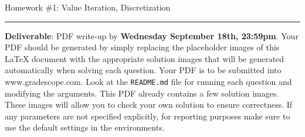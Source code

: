 \documentclass{article}
\newcommand{\ruleskip}{\bigskip\hrule\bigskip}
\begin{document}
\pagestyle{myheadings} 

{\huge
\noindent Homework \#1: Value Iteration, Discretization}
\ruleskip

{\bf Deliverable}:  PDF write-up by {\bf Wednesday September 18th, 23:59pm}.  Your PDF should be generated by simply replacing the placeholder images of this LaTeX document with the appropriate solution images that will be generated automatically when solving each question.  Your PDF is to be submitted into www.gradescope.com.  Look at the \texttt{README.md} file for running each question and modifying the arguments. This PDF already contains a few solution images.  These images will allow you to check your own solution to ensure correctness.  If any parameters are not specified explicitly, for reporting purposes make sure to use the default settings in the environments.   


\vspace{.2in}

\end{document}
